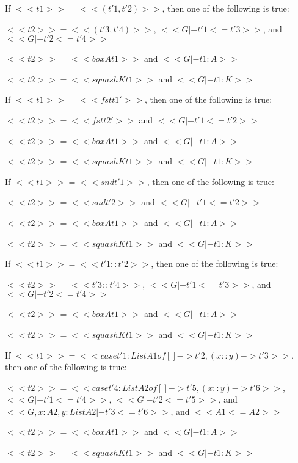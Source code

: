 \begin{lemma}
\begin{enumR}
  \item If $<<t1>> = <<(t'1,t'2)>>$, then one of the following is true:
    \begin{enumA}
    \item $<<t2>> = <<(t'3,t'4)>>$, $<<G |- t'1 <= t'3>>$, and $<<G |- t'2 <= t'4>>$
    \item $<<t2>> = <<box A t1>>$ and $<<G |- t1 : A>>$
    \item $<<t2>> = <<squash K t1>>$ and $<<G |- t1 : K>>$
    \end{enumA}

  \item If $<<t1>> = <<fst t1'>>$, then one of the following is true:
    \begin{enumA}
    \item $<<t2>> = <<fst t2'>>$ and $<<G |- t'1 <= t'2>>$
    \item $<<t2>> = <<box A t1>>$ and $<<G |- t1 : A>>$
    \item $<<t2>> = <<squash K t1>>$ and $<<G |- t1 : K>>$
    \end{enumA}

  \item If $<<t1>> = <<snd t'1>>$, then one of the following is true:
    \begin{enumA}
    \item $<<t2>> = <<snd t'2>>$ and $<<G |- t'1 <= t'2>>$
    \item $<<t2>> = <<box A t1>>$ and $<<G |- t1 : A>>$
    \item $<<t2>> = <<squash K t1>>$ and $<<G |- t1 : K>>$
    \end{enumA}

  \item If $<<t1>> = <<t'1 :: t'2>>$, then one of the following is true:
    \begin{enumA}
    \item $<<t2>> = <<t'3 :: t'4>>$, $<<G |- t'1 <= t'3>>$, and $<<G |- t'2 <= t'4>>$
    \item $<<t2>> = <<box A t1>>$ and $<<G |- t1 : A>>$
    \item $<<t2>> = <<squash K t1>>$ and $<<G |- t1 : K>>$
    \end{enumA}

  \item If $<<t1>> = <<case t'1 : List A1 of [] -> t'2, (x::y) -> t'3>>$,
    then one of the following is true:
    \begin{enumA}
    \item $<<t2>> = <<case t'4 : List A2 of [] -> t'5, (x::y) -> t'6>>$,
      $<<G |- t'1 <= t'4>>$, $<<G |- t'2 <= t'5>>$, and $<<G, x : A2, y : List A2 |- t'3 <= t'6>>$,
      and $<<A1 <= A2>>$
    \item $<<t2>> = <<box A t1>>$ and $<<G |- t1 : A>>$
    \item $<<t2>> = <<squash K t1>>$ and $<<G |- t1 : K>>$
    \end{enumA}


\end{enumR}
\end{lemma}
